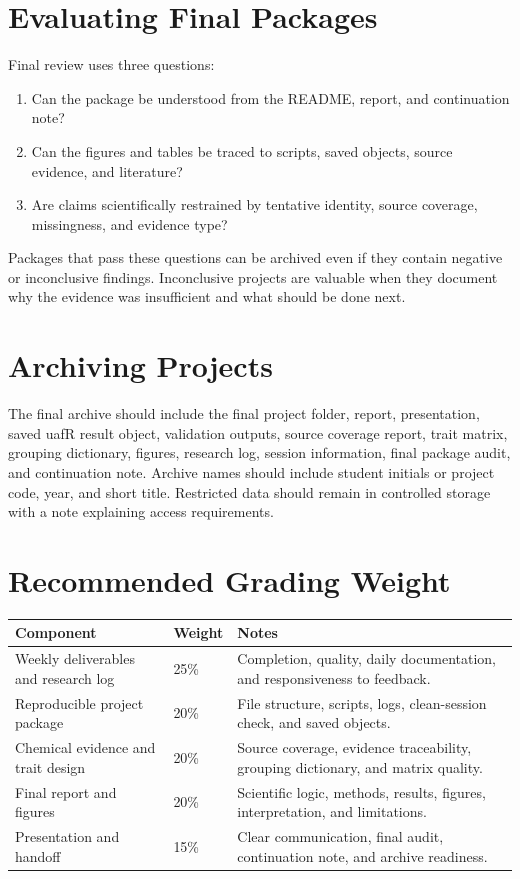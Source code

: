 \section{Evaluating Final Packages}
Final review uses three questions:
\begin{enumerate}
  \item Can the package be understood from the README, report, and continuation note?
  \item Can the figures and tables be traced to scripts, saved objects, source evidence, and literature?
  \item Are claims scientifically restrained by tentative identity, source coverage, missingness, and evidence type?
\end{enumerate}

Packages that pass these questions can be archived even if they contain negative or inconclusive findings. Inconclusive projects are valuable when they document why the evidence was insufficient and what should be done next.

\section{Archiving Projects}
The final archive should include the final project folder, report, presentation, saved uafR result object, validation outputs, source coverage report, trait matrix, grouping dictionary, figures, research log, session information, final package audit, and continuation note. Archive names should include student initials or project code, year, and short title. Restricted data should remain in controlled storage with a note explaining access requirements.

\section{Recommended Grading Weight}
\begin{tabularx}{\textwidth}{p{}p{}Y}
\toprule
\textbf{Component} & \textbf{Weight} & \textbf{Notes}\\
\midrule
Weekly deliverables and research log & 25\% & Completion, quality, daily documentation, and responsiveness to feedback.\\
Reproducible project package & 20\% & File structure, scripts, logs, clean-session check, and saved objects.\\
Chemical evidence and trait design & 20\% & Source coverage, evidence traceability, grouping dictionary, and matrix quality.\\
Final report and figures & 20\% & Scientific logic, methods, results, figures, interpretation, and limitations.\\
Presentation and handoff & 15\% & Clear communication, final audit, continuation note, and archive readiness.\\
\bottomrule
\end{tabularx}
